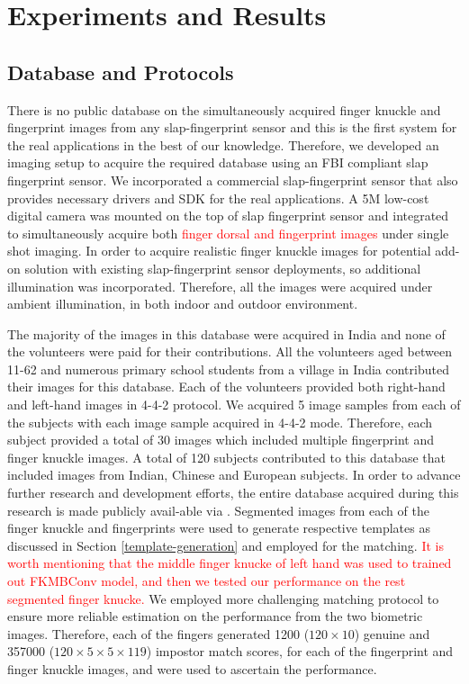 \section{Experiments and Results\label{experiment}}

\subsection{Database and Protocols\label{database-protocol}}

There is no public database on the simultaneously acquired finger knuckle and fingerprint images from any slap-fingerprint sensor and this is the first system for the real applications in the best of our knowledge. Therefore, we developed an imaging setup to acquire the required database using an FBI compliant slap fingerprint sensor. We incorporated a commercial slap-fingerprint sensor \cite{futronic} that also provides necessary drivers and SDK for the real applications. A 5M low-cost digital camera \cite{mindvision} was mounted on the top of slap fingerprint sensor and integrated to simultaneously acquire both \textcolor{red}{finger dorsal and fingerprint images} under single shot imaging. In order to acquire realistic finger knuckle images for potential add-on solution with existing slap-fingerprint sensor deployments, so additional illumination was incorporated. Therefore, all the images were acquired under ambient illumination, in both indoor and outdoor environment.

The majority of the images in this database were acquired in India and none of the volunteers were paid for their contributions. All the volunteers aged between 11-62 and numerous primary school students from a village in India contributed their images for this database. Each of the volunteers provided both right-hand and left-hand images in 4-4-2 protocol. We acquired 5 image samples from each of the subjects with each image sample acquired in 4-4-2 mode. Therefore, each subject provided a total of 30 images which included multiple fingerprint and finger knuckle images. A total of 120 subjects contributed to this database that included images from Indian, Chinese and European subjects. In order to advance further research and development efforts, the entire database acquired during this research is made publicly avail-able via \cite{datalink}. Segmented images from each of the finger knuckle and fingerprints were used to generate respective templates as discussed in Section \ref{template-generation} and employed for the matching. \textcolor{red}{It is worth mentioning that the middle finger knucke of left hand was used to trained out FKMBConv model, and then we tested our performance on the rest segmented finger knucke.} We employed more challenging matching protocol to ensure more reliable estimation on the performance from the two biometric images. Therefore, each of the fingers generated 1200 ($120 \times 10$) genuine and 357000 ($120 \times 5 \times 5 \times 119$) impostor match scores, for each of the fingerprint and finger knuckle images, and were used to ascertain the performance.  